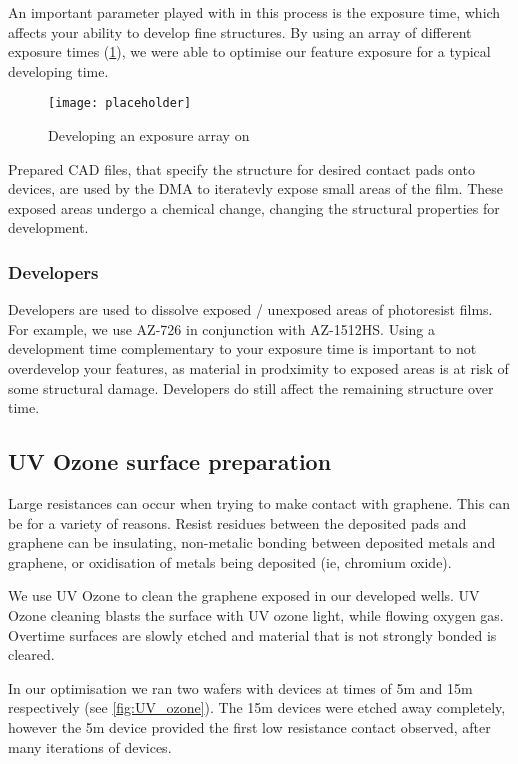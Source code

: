 \documentclass[../../Matt_Gebert_Honours_Thesis.tex]{subfiles}
\begin{document}
	An important parameter played with in this process is the exposure time, which affects your ability to develop fine structures. By using an array of different exposure times (\cref{fig:exposure_array}), we were able to optimise our feature exposure for a typical developing time.
	
	\begin{figure}[H]
		\centering
		\texttt{[image: placeholder]}
		\caption{Developing an exposure array on \silicondioxide}\label{fig:exposure_array}
	\end{figure}
	
	Prepared CAD files, that specify the structure for desired contact pads onto devices, are used by the DMA to iteratevly expose small areas of the film. These exposed areas undergo a chemical change, changing the structural properties for development.
	
	\subsubsection{Developers}\label{sec:developer}
	Developers are used to dissolve exposed / unexposed areas of photoresist films. For example, we use AZ-726 in conjunction with AZ-1512HS. Using a development time complementary to your exposure time is important to not overdevelop your features, as material in prodximity to exposed areas is at risk of some structural damage. Developers do still affect the remaining structure over time.
	
	\subsection{UV Ozone surface preparation}\label{sec:uv_ozone}
	Large resistances can occur when trying to make contact with graphene. This can be for a variety of reasons. Resist residues between the deposited pads and graphene can be insulating, non-metalic bonding between deposited metals and graphene, or oxidisation of metals being deposited (ie, chromium oxide).
	
	We use UV Ozone to clean the graphene exposed in our developed wells. UV Ozone cleaning blasts the surface with UV ozone light, while flowing oxygen gas. Overtime surfaces are slowly etched and material that is not strongly bonded is cleared. 
	
	In our optimisation we ran two wafers with devices at times of 5m and 15m respectively (see \cref{fig:UV_ozone}). The 15m devices were etched away completely, however the 5m device provided the first low resistance contact observed, after many iterations of devices.
	
\end{document}
